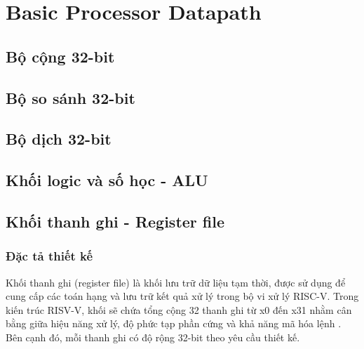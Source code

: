 
\chapter{Basic Processor Datapath}
\label{chap:milestone_1}

\section{Bộ cộng 32-bit}
\label{sec:m1-32b_adder}

\section{Bộ so sánh 32-bit}
\label{sec:m1-32b_comp}

\section{Bộ dịch 32-bit}
\label{sec:m1-32b_shift}

\section{Khối logic và số học - ALU}
\label{sec:m1-alu}

\section{Khối thanh ghi - Register file}
\label{sec:m1-reg_file}

\subsection{Đặc tả thiết kế}
\label{subsec:m1-reg_file_spec}
Khối thanh ghi (register file) là khối lưu trữ dữ liệu tạm thời, được sử dụng để cung cấp các toán hạng và lưu trữ kết quả xử lý trong bộ vi xử lý RISC-V.
Trong kiến trúc RISV-V, khối sẽ chứa tổng cộng 32 thanh ghi từ x0 đến x31 nhằm cân bằng giữa hiệu năng xử lý, độ phức tạp phần cứng và khả năng mã hóa lệnh \cite{riscv_isa_manual}. 
Bên cạnh đó, mỗi thanh ghi có độ rộng 32-bit theo yêu cầu thiết kế.

